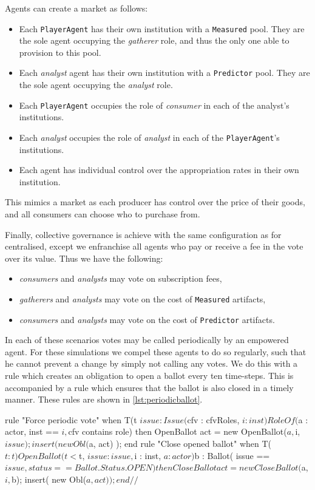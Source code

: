Agents can create a market as follows:

\begin{itemize}
\item Each \texttt{PlayerAgent} has their own institution with a \texttt{Measured} pool. They are the sole agent occupying the \emph{gatherer} role, and thus the only one able to provision to this pool.
\item Each \emph{analyst} agent has their own institution with a \texttt{Predictor} pool. They are the sole agent occupying the \emph{analyst} role.
\item Each \texttt{PlayerAgent} occupies the role of \emph{consumer} in each of the analyst's institutions.
\item Each \emph{analyst} occupies the role of \emph{analyst} in each of the \texttt{PlayerAgent}'s institutions.
\item Each agent has individual control over the appropriation rates in their own institution.
\end{itemize}

This mimics a market as each producer has control over the price of their goods, and all consumers can choose who to purchase from.

Finally, collective governance is achieve with the same configuration as for centralised, except we enfranchise all agents who pay or receive a fee in the vote over its value. Thus we have the following:

\begin{itemize}
\item \emph{consumers} and \emph{analysts} may vote on subscription fees,
\item \emph{gatherers} and \emph{analysts} may vote on the cost of \texttt{Measured} artifacts,
\item \emph{consumers} and \emph{analysts} may vote on the cost of \texttt{Predictor} artifacts.
\end{itemize}

In each of these scenarios votes may be called periodically by an empowered
agent. For these simulations we compel these agents to do so regularly, such
that he cannot prevent a change by simply not calling any votes. We do this
with a rule which creates an obligation to open a ballot every ten time-steps.
This is accompanied by a  rule which ensures that the ballot is also closed in
a timely manner. These rules are shown in \autoref{lst:periodicballot}.

\begin{drools}[label=lst:periodicballot,caption=Rules to force opening and closing of ballots]
rule "Force periodic vote"
	when
		T(t %
		$issue : Issue($cfv : cfvRoles, $i : inst)
		RoleOf($a : actor, inst == $i, $cfv contains role)
	then
		OpenBallot act = new OpenBallot($a, $i, $issue);
		insert( new Obl($a, act) );
end
rule "Close opened ballot"
	when
		T($t : t)
		OpenBallot(t < $t, $issue : issue, $i : inst, $a : actor)
		$b : Ballot( issue == $issue, status == Ballot.Status.OPEN )
	then
		CloseBallot act = new CloseBallot($a, $i, $b);
		insert( new Obl($a, act) );
end//$
\end{drools}

